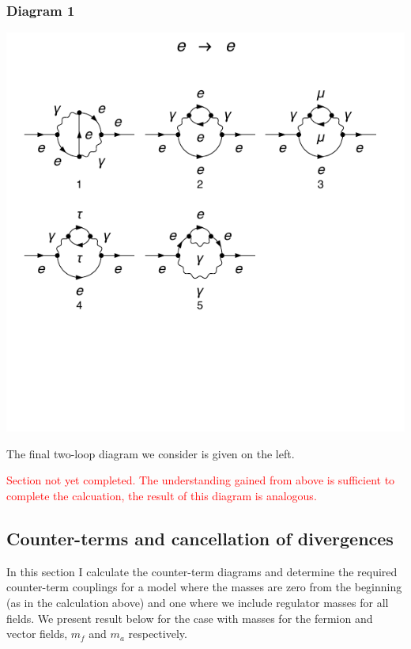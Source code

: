 \documentclass[11pt]{article}
\begin{document}
\subsubsection{Diagram 1}
\noindent\begin{minipage}{0.3\textwidth}
\begin{center}
\includegraphics{QED_F_2loop_1.pdf}
\end{center}
\end{minipage}
\noindent\begin{minipage}{0.7\textwidth}

The final two-loop diagram we consider is given on the left. 

\textcolor{red}{Section not yet completed.  The understanding gained from above is sufficient to complete the calcuation, the result of this diagram is analogous.}



\end{minipage}

\subsection{Counter-terms and cancellation of divergences}

In this section I calculate the counter-term diagrams and determine the required counter-term couplings for a model where the masses are zero from the beginning (as in the calculation above) and one where we include regulator masses for all fields.  We present result below for the case with masses for the fermion and vector fields, $m_f$ and $m_a$ respectively.
\end{document}
